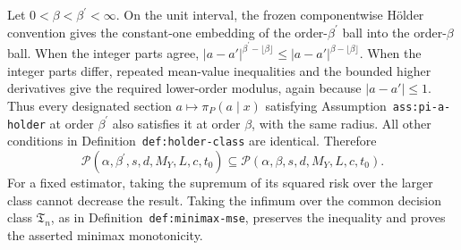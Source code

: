 Let \(0<\beta<\beta^{\prime}<\infty\). On the unit interval, the frozen componentwise H\"older convention gives the constant-one embedding of the order-\(\beta^{\prime}\) ball into the order-\(\beta\) ball. When the integer parts agree, \(\lvert a-a'\rvert^{\beta^{\prime}-\lfloor\beta\rfloor}\le \lvert a-a'\rvert^{\beta-\lfloor\beta\rfloor}\). When the integer parts differ, repeated mean-value inequalities and the bounded higher derivatives give the required lower-order modulus, again because \(\lvert a-a'\rvert\le1\). Thus every designated section \(a\mapsto\pi_P(a\mid x)\) satisfying Assumption~\texttt{ass:pi-a-holder} at order \(\beta^{\prime}\) also satisfies it at order \(\beta\), with the same radius. All other conditions in Definition~\texttt{def:holder-class} are identical. Therefore
\[
\mathcal P(\alpha,\beta^{\prime},s,d,M_Y,L,c,t_0)
\subseteq
\mathcal P(\alpha,\beta,s,d,M_Y,L,c,t_0).
\]
For a fixed estimator, taking the supremum of its squared risk over the larger class cannot decrease the result. Taking the infimum over the common decision class \(\mathfrak T_n\), as in Definition~\texttt{def:minimax-mse}, preserves the inequality and proves the asserted minimax monotonicity.